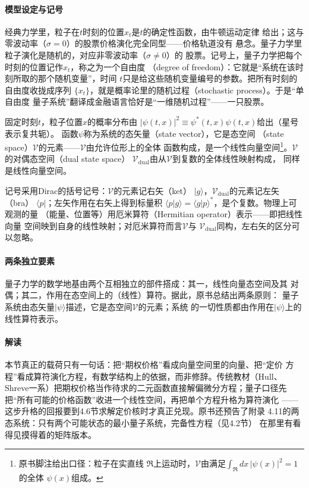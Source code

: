 \paragraph{模型设定与记号}
经典力学里，粒子在$t$时刻的位置$x_t$是$t$的确定性函数，由牛顿运动定律
给出；这与零波动率（$\sigma=0$）的股票价格演化完全同型——价格轨道没有
悬念。量子力学里粒子演化是随机的，对应非零波动率（$\sigma\neq0$）的
股票。记号上，量子力学把每个时刻的位置记作$x_t$，称之为一个自由度
（degree of freedom）：它就是“系统在该时刻所取的那个随机变量”，时间
$t$只是给这些随机变量编号的参数。把所有时刻的自由度收拢成序列
$\{x_t\}$，就是概率论里的随机过程（stochastic process）。于是“单自由度
量子系统”翻译成金融语言恰好是“一维随机过程”——一只股票。

固定时刻$t$，粒子位置$x$的概率分布由
$|\psi(t,x)|^{2}\equiv\psi^{*}(t,x)\psi(t,x)$给出（星号表示复共轭）。
函数$\psi$称为系统的态矢量（state vector），它是态空间
（state space）$\mathcal{V}$的元素——$\mathcal{V}$由允许位形上的全体
函数构成，是一个线性向量空间\footnote{原书脚注给出口径：粒子在实直线
$\Re$上运动时，$\mathcal{V}$由满足$\int_{\Re}dx\,|\psi(x)|^{2}=1$的全体
$\psi(x)$组成。}。$\mathcal{V}$的对偶态空间（dual state space）
$\mathcal{V}_{\mathrm{dual}}$由从$\mathcal{V}$到复数的全体线性映射构成，
同样是线性向量空间。

记号采用Dirac的括号记号：$\mathcal{V}$的元素记右矢（ket）
$|g\rangle$，$\mathcal{V}_{\mathrm{dual}}$的元素记左矢（bra）
$\langle p|$；左矢作用在右矢上得到标量积
$\langle p|g\rangle=\langle g|p\rangle^{*}$，是个复数。物理上可观测的量
（能量、位置等）用厄米算符（Hermitian operator）表示——即把线性向量
空间映到自身的线性映射；对厄米算符而言$\mathcal{V}$与
$\mathcal{V}_{\mathrm{dual}}$同构，左右矢的区分可以忽略。

\paragraph{两条独立要素}
量子力学的数学地基由两个互相独立的部件搭成：其一，线性向量态空间及其
对偶；其二，作用在态空间上的（线性）算符。据此，原书总结出两条原则：
量子系统由态矢量$|\psi\rangle$描述，它是态空间$\mathcal{V}$的元素；系统
的一切性质都由作用在$|\psi\rangle$上的线性算符表示。

\paragraph{解读}
本节真正的载荷只有一句话：把“期权价格”看成向量空间里的向量、把“定价
方程”看成算符演化方程，有数学结构上的依据，而非修辞。传统教材（Hull、
Shreve一系）把期权价格当作待求的二元函数直接解偏微分方程；量子口径先
把“所有可能的价格函数”收进一个线性空间，再把单个方程升格为算符演化
——这步升格的回报要到4.6节求解定价核时才真正兑现。原书还预告了附录
4.11的两态系统：只有两个可能状态的最小量子系统，完备性方程（见4.2节）
在那里有看得见摸得着的矩阵版本。

